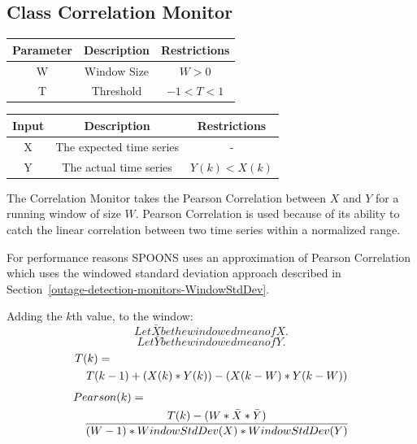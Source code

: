 \documentclass[12pt]{ucthesis}
\begin{document}
\subsection{Class Correlation Monitor}
\label{outage-detection-monitors-Correlation}
\begin{table}[H]
   \begin{center}
      \begin{tabular}{|c|c|c|}
         \hline
            Parameter & Description & Restrictions \\
         \hline
            W & Window Size & $ W > 0 $\\
         \hline
            T & Threshold & $ -1 < T < 1 $\\
         \hline
      \end{tabular}
   \end{center}
\end{table}

\begin{table}[H]
   \begin{center}
      \begin{tabular}{|c|c|c|}
         \hline
            Input & Description & Restrictions \\
         \hline
            X & The expected time series & - \\
         \hline
            Y & The actual time series & $ Y(k) < X(k) $\\
         \hline
      \end{tabular}
   \end{center}
\end{table}

The Correlation Monitor takes the Pearson Correlation between $X$ and $Y$ for a running window of size $W$.
Pearson Correlation is used because of its ability to catch the linear correlation between two time series within
a normalized range.

For performance reasons SPOONS uses an approximation of Pearson Correlation which uses the windowed standard deviation approach
described in Section~\ref{outage-detection-monitors-WindowStdDev}.

Adding the $k$th value, to the window:
$$
   Let \bar{X} be the windowed mean of X.
$$
$$
   Let \bar{Y} be the windowed mean of Y.
$$
\begin{eqnarray*}
   \lefteqn{T(k) = }\\
   && T(k - 1) + (X(k) * Y(k)) - (X(k - W) * Y(k -W))
\end{eqnarray*}
\begin{eqnarray*}
   \lefteqn{Pearson(k) = }\\
   && \frac{T(k) - (W * \bar{X} * \bar{Y})}{(W - 1) * WindowStdDev(X) * WindowStdDev(Y)}
\end{eqnarray*}
\end{document}
